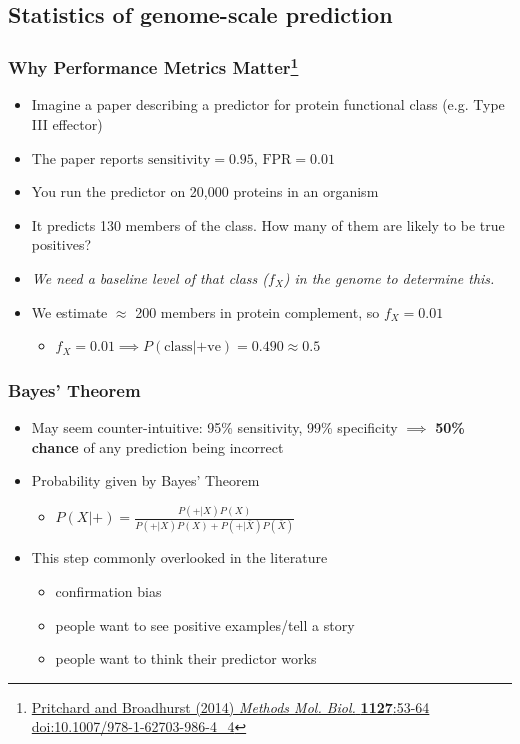 


\subsection{Statistics of genome-scale prediction}
\begin{frame}
  \frametitle{Why Performance Metrics Matter\footnote{\tiny{\href{http://dx.doi.org/10.1007/978-1-62703-986-4_4}{Pritchard and Broadhurst (2014) \textit{Methods Mol. Biol.} \textbf{1127}:53-64 doi:10.1007/978-1-62703-986-4\_4}}}}
  \begin{itemize}
    \item<1-> Imagine a paper describing a predictor for protein functional class (e.g. Type III effector)
    \item<1-> The paper reports \textbf{$\text{sensitivity}=0.95$}, \textbf{$\text{FPR}=0.01$}
    \item<1-> You run the predictor on 20,000 proteins in an organism
    \item<1-> It predicts 130 members of the class. How many of them are likely to be true positives?
    \item<2-> \textit{We need a baseline level of that class ($f_X$) in the genome to determine this.}        
    \item<2-> We estimate $\approx$ 200 members in protein complement, so $f_X=0.01$
    \begin{itemize}
      \item $f_X = 0.01 \implies P(\text{class}|\text{+ve}) = 0.490 \approx 0.5$
    \end{itemize}
  \end{itemize} 
\end{frame}

\begin{frame}
  \frametitle{Bayes' Theorem}
  \begin{itemize}
    \item May seem counter-intuitive: 95\% sensitivity, 99\% specificity $\implies$ \textbf{50\% chance} of any prediction being incorrect
    \item Probability given by Bayes' Theorem
    \begin{itemize}
      \item $P(X|+) =  \frac{P(+|X) P(X)}{P(+|X) P(X) + P(+|\bar{X}) P(\bar{X})}$
    \end{itemize}
    \item This step commonly overlooked in the literature
      \begin{itemize}
        \item confirmation bias
        \item people want to see positive examples/tell a story
        \item people want to think their predictor works
      \end{itemize}
  \end{itemize} 
\end{frame}

